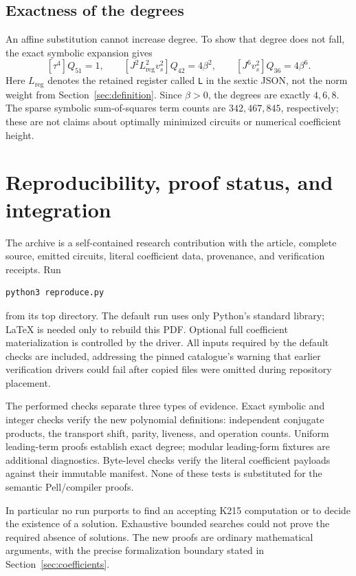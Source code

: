 \documentclass[11pt]{article}
\theoremstyle{remark}\newtheorem{remark}[theorem]{Remark}
\begin{document}
\subsection{Exactness of the degrees}

An affine substitution cannot increase degree. To show that degree does
not fall, the exact symbolic expansion gives
\[
 [\tau^4]Q_{51}=1,\qquad
 [J^2L_\mathrm{reg}^2v_s^2]Q_{42}=4\beta^2,\qquad
 [J^6v_s^2]Q_{36}=4\beta^6.
\]
Here $L_\mathrm{reg}$ denotes the retained register called \texttt{L} in
the sextic JSON, not the norm weight from Section~\ref{sec:definition}.
Since $\beta>0$, the degrees are exactly $4,6,8$. The sparse symbolic
sum-of-squares term counts are $342,467,845$, respectively; these are not
claims about optimally minimized circuits or numerical coefficient height.

\section{Reproducibility, proof status, and integration}
\label{sec:reproduce}

The archive is a self-contained research contribution with the article,
complete source, emitted circuits, literal coefficient data, provenance,
and verification receipts. Run
\begin{lstlisting}
python3 reproduce.py
\end{lstlisting}
from its top directory. The default run uses only Python's standard library;
LaTeX is needed only to rebuild this PDF. Optional full coefficient
materialization is controlled by the driver. All inputs required by the
default checks are included, addressing the pinned catalogue's warning
that earlier verification drivers could fail after copied files were
omitted during repository placement.

The performed checks separate three types of evidence. Exact symbolic and
integer checks verify the new polynomial definitions: independent conjugate
products, the transport shift, parity, liveness, and operation counts.
Uniform leading-term proofs establish exact degree; modular leading-form
fixtures are additional diagnostics. Byte-level checks verify the literal
coefficient payloads against their immutable manifest. None of these tests
is substituted for the semantic Pell/compiler proofs.

In particular no run purports to find an accepting K215 computation or
to decide the existence of a solution. Exhaustive bounded searches could
not prove the required absence of solutions. The new proofs are ordinary
mathematical arguments, with the precise formalization boundary stated in
Section~\ref{sec:coefficients}.
\end{document}
